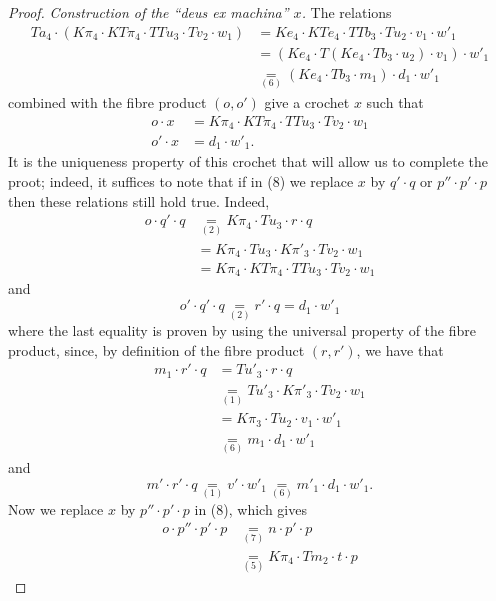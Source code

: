 \documentclass[fleqn]{article}
\newcommand{\oldpage}[1]{\marginpar{\footnotesize$\Big\vert$ \textit{p.~#1}}}
\begin{document}
\begin{proof}
  \emph{Construction of the ``deus ex machina'' $x$.}
  The relations
  \[
    \begin{aligned}
      Ta_4\cdot (K\pi_4\cdot KT\pi_4\cdot TTu_3\cdot Tv_2\cdot w_1)
      &= Ke_4\cdot KTe_4\cdot TTb_3\cdot Tu_2\cdot v_1\cdot w'_1
    \\&= (Ke_4\cdot T(Ke_4\cdot Tb_3\cdot u_2)\cdot v_1)\cdot w'_1
    \\&\underset{(6)}{=} (Ke_4\cdot Tb_3\cdot m_1)\cdot d_1\cdot w'_1
    \end{aligned}
  \]
  combined with the fibre product $(o,o')$ give a crochet $x$ such that
  \[
    \begin{aligned}
      o\cdot x
      &= K\pi_4\cdot KT\pi_4\cdot TTu_3\cdot Tv_2\cdot w_1
    \\o'\cdot x
      &= d_1\cdot w'_1.
    \end{aligned}
    \tag{8}
  \]
  It is the uniqueness property of this crochet that will allow us to complete the proot;
  indeed, it suffices to note that if in (8) we replace $x$ by $q'\cdot q$ or $p''\cdot p'\cdot p$ then these relations still hold true.
  Indeed,
  \[
    \begin{aligned}
      o\cdot q'\cdot q
      &\underset{(2)}{=} K\pi_4\cdot Tu_3\cdot r\cdot q
    \\&= K\pi_4\cdot Tu_3\cdot K\pi'_3\cdot Tv_2\cdot w_1
    \\&= K\pi_4\cdot KT\pi_4\cdot TTu_3\cdot Tv_2\cdot w_1
    \end{aligned}
  \]
  and
  \[
    o'\cdot q'\cdot q
    \underset{(2)}{=} r'\cdot q
    = d_1\cdot w'_1
  \]
  where the last equality is proven by using the universal property of the fibre product, since, by definition of the fibre product $(r,r')$, we have that
  \[
    \begin{aligned}
      m_1\cdot r'\cdot q
      &= Tu'_3\cdot r\cdot q
    \\&\underset{(1)}{=} Tu'_3\cdot K\pi'_3\cdot Tv_2\cdot w_1
    \\&= K\pi_3\cdot Tu_2\cdot v_1\cdot w'_1
    \\&\underset{(6)}{=} m_1\cdot d_1\cdot w'_1
    \end{aligned}
  \]
  \oldpage{256}
  and
  \[
    m'\cdot r'\cdot q
    \underset{(1)}{=} v'\cdot w'_1
    \underset{(6)}{=} m'_1\cdot d_1\cdot w'_1.
  \]
  Now we replace $x$ by $p''\cdot p'\cdot p$ in (8), which gives
  \[
    \begin{aligned}
      o\cdot p''\cdot p'\cdot p
      &\underset{(7)}{=} n\cdot p'\cdot p
    \\&\underset{(5)}{=} K\pi_4\cdot Tm_2\cdot t\cdot p

\end{aligned}\]
\end{proof}
\end{document}
